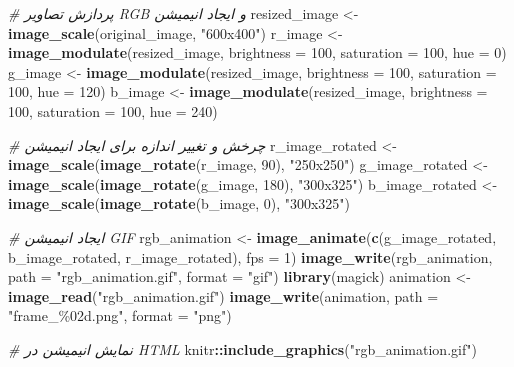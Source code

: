 \documentclass[
]{article}
\newenvironment{Shaded}{\begin{snugshade}}{\end{snugshade}}
\newcommand{\AttributeTok}[1]{\textcolor[rgb]{0.13,0.29,0.53}{#1}}
\newcommand{\CommentTok}[1]{\textcolor[rgb]{0.56,0.35,0.01}{\textit{#1}}}
\newcommand{\DecValTok}[1]{\textcolor[rgb]{0.00,0.00,0.81}{#1}}
\newcommand{\FunctionTok}[1]{\textcolor[rgb]{0.13,0.29,0.53}{\textbf{#1}}}
\newcommand{\NormalTok}[1]{#1}
\newcommand{\OtherTok}[1]{\textcolor[rgb]{0.56,0.35,0.01}{#1}}
\newcommand{\SpecialCharTok}[1]{\textcolor[rgb]{0.81,0.36,0.00}{\textbf{#1}}}
\newcommand{\StringTok}[1]{\textcolor[rgb]{0.31,0.60,0.02}{#1}}
\begin{document}
\begin{Shaded}
\begin{Highlighting}[]
\CommentTok{\# پردازش تصاویر RGB و ایجاد انیمیشن}
\NormalTok{resized\_image }\OtherTok{\textless{}{-}} \FunctionTok{image\_scale}\NormalTok{(original\_image, }\StringTok{"600x400"}\NormalTok{)}
\NormalTok{r\_image }\OtherTok{\textless{}{-}} \FunctionTok{image\_modulate}\NormalTok{(resized\_image, }\AttributeTok{brightness =} \DecValTok{100}\NormalTok{, }\AttributeTok{saturation =} \DecValTok{100}\NormalTok{, }\AttributeTok{hue =} \DecValTok{0}\NormalTok{)}
\NormalTok{g\_image }\OtherTok{\textless{}{-}} \FunctionTok{image\_modulate}\NormalTok{(resized\_image, }\AttributeTok{brightness =} \DecValTok{100}\NormalTok{, }\AttributeTok{saturation =} \DecValTok{100}\NormalTok{, }\AttributeTok{hue =} \DecValTok{120}\NormalTok{)}
\NormalTok{b\_image }\OtherTok{\textless{}{-}} \FunctionTok{image\_modulate}\NormalTok{(resized\_image, }\AttributeTok{brightness =} \DecValTok{100}\NormalTok{, }\AttributeTok{saturation =} \DecValTok{100}\NormalTok{, }\AttributeTok{hue =} \DecValTok{240}\NormalTok{)}

\CommentTok{\# چرخش و تغییر اندازه برای ایجاد انیمیشن}
\NormalTok{r\_image\_rotated }\OtherTok{\textless{}{-}} \FunctionTok{image\_scale}\NormalTok{(}\FunctionTok{image\_rotate}\NormalTok{(r\_image, }\DecValTok{90}\NormalTok{), }\StringTok{"250x250"}\NormalTok{)}
\NormalTok{g\_image\_rotated }\OtherTok{\textless{}{-}} \FunctionTok{image\_scale}\NormalTok{(}\FunctionTok{image\_rotate}\NormalTok{(g\_image, }\DecValTok{180}\NormalTok{), }\StringTok{"300x325"}\NormalTok{)}
\NormalTok{b\_image\_rotated }\OtherTok{\textless{}{-}} \FunctionTok{image\_scale}\NormalTok{(}\FunctionTok{image\_rotate}\NormalTok{(b\_image, }\DecValTok{0}\NormalTok{), }\StringTok{"300x325"}\NormalTok{)}

\CommentTok{\# ایجاد انیمیشن GIF}
\NormalTok{rgb\_animation }\OtherTok{\textless{}{-}} \FunctionTok{image\_animate}\NormalTok{(}\FunctionTok{c}\NormalTok{(g\_image\_rotated, b\_image\_rotated, r\_image\_rotated), }\AttributeTok{fps =} \DecValTok{1}\NormalTok{)}
\FunctionTok{image\_write}\NormalTok{(rgb\_animation, }\AttributeTok{path =} \StringTok{"rgb\_animation.gif"}\NormalTok{, }\AttributeTok{format =} \StringTok{"gif"}\NormalTok{)}
\FunctionTok{library}\NormalTok{(magick)}
\NormalTok{animation }\OtherTok{\textless{}{-}} \FunctionTok{image\_read}\NormalTok{(}\StringTok{"rgb\_animation.gif"}\NormalTok{)}
\FunctionTok{image\_write}\NormalTok{(animation, }\AttributeTok{path =} \StringTok{"frame\_\%02d.png"}\NormalTok{, }\AttributeTok{format =} \StringTok{"png"}\NormalTok{)}

\CommentTok{\# نمایش انیمیشن در HTML}
\NormalTok{knitr}\SpecialCharTok{::}\FunctionTok{include\_graphics}\NormalTok{(}\StringTok{"rgb\_animation.gif"}\NormalTok{)}
\end{Highlighting}
\end{Shaded}
\end{document}

